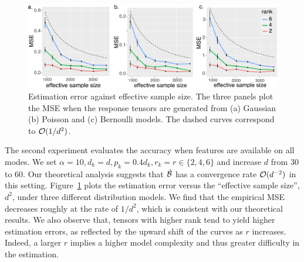 \documentclass[12pt]{article}
\theoremstyle{definition}
\theoremstyle{definition}
\begin{document}
\begin{table}[tb]
\caption{Rank selection via BIC. The estimated ranks are averaged across 30 simulation. Bold number indicates the ground truth is within two standard deviations of the estimate.}\label{tab:rank}
\vspace{-.1cm}
\end{table}

\begin{figure}[!h]
\centering
\includegraphics[width=14cm]{dimension.pdf}
\caption{Estimation error against effective sample size. The three panels plot the MSE when the response tensors are generated from (a) Gaussian (b) Poisson and (c) Bernoulli models. The dashed curves correspond to $\mathcal{O}({1/d^2})$.}\label{fig:dim}
\vspace{-.1cm}
\end{figure}

The second experiment evaluates the accuracy when features are available on all modes. We set $\alpha=10, d_k=d, p_k=0.4d_k, r_k=r\in\{2,4,6\}$ and increase $d$ from 30 to 60. Our theoretical analysis suggests that $\hat {\mathcal{B}}$ has a convergence rate $\mathcal{O}(d^{-2})$ in this setting. Figure~\ref{fig:dim} plots the estimation error versus the ``effective sample size'', $d^2$, under three different distribution models. We find that the empirical MSE decreases roughly at the rate of $1/d^2$, which is consistent with our theoretical results. We also observe that, tensors with higher rank tend to yield higher estimation errors, as reflected by the upward shift of the curves as $r$ increases. Indeed, a larger $r$ implies a higher model complexity and thus greater difficulty in the estimation. 
\end{document}

